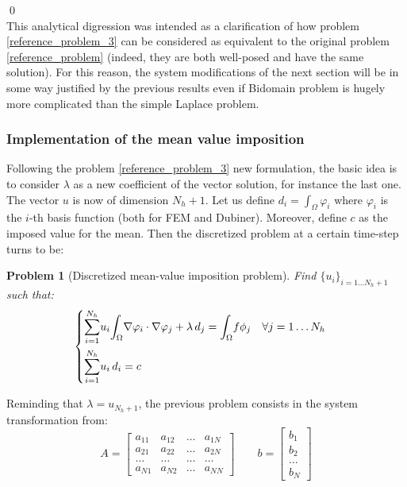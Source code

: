 \documentclass[a4paper,11pt]{article}
\newtheorem{problem}{Problem}
\begin{document}
	\qed
	\vspace{3mm} \\
	\noindent This analytical digression was intended as a clarification of how problem \ref{reference_problem_3} can be considered as equivalent to the original problem \ref{reference_problem} (indeed, they are both well-posed and have the same solution). For this reason, the system modifications of the next section will be in some way justified by the previous results even if Bidomain problem is hugely more complicated than the simple Laplace problem.



\subsubsection{Implementation of the mean value imposition} \label{mean_value_implementation}
\noindent Following the problem \ref{reference_problem_3} new formulation, the basic idea is to consider $\lambda$ as a new coefficient of the vector solution, for instance the last one. The vector $u$ is now of dimension $N_h+1$. Let us define $d_i=\int_\Omega \varphi_i$ where $\varphi_i$ is the $i$-th basis function (both for FEM and Dubiner). Moreover, define $c$ as the imposed value for the mean. Then the discretized problem at a certain time-step turns to be:

\begin{problem}[Discretized mean-value imposition problem]
	Find $\{u_i\}_{i=1\dots N_h+1}$ such that:
	\begin{equation*}
	\begin{cases}
	\mathlarger{\sum}_{i=1}^{N_h} u_i \mathlarger{\int}_{\Omega}\nabla\varphi_i \cdot \nabla \varphi_j + \lambda \,d_j=\mathlarger{\int}_{\Omega}f\phi_j \quad \forall j=1\dots N_h \\[3ex]
	\mathlarger{\sum}_{i=1}^{N_h} u_i \,d_i = c
	\end{cases}
	\end{equation*}
\end{problem}
\vspace{3mm}
\noindent Reminding that $\lambda=u_{N_h+1}$, the previous problem consists in the system transformation from: \\
\begin{equation*}
A=\begin{bmatrix}
a_{11} & a_{12} & \dots & a_{1N} \\ 
a_{21} & a_{22} & \dots & a_{2N} \\ 
\dots & \dots & \dots & \dots \\
a_{N1}  & a_{N2} & \dots & a_{NN}
\end{bmatrix} \quad \quad
b=\begin{bmatrix}
b_1 \\ b_2 \\ \dots \\ b_N
\end{bmatrix}
\end{equation*}
\end{document}
